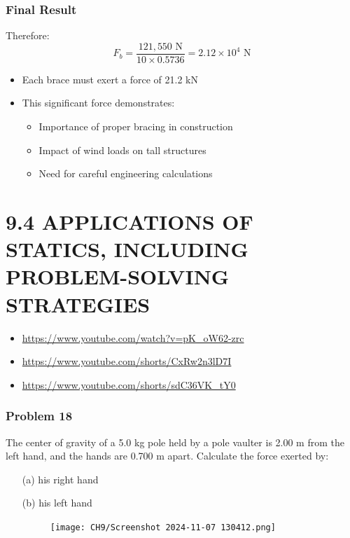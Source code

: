 \documentclass{beamer}
\begin{document}
\begin{frame}
\frametitle{Final Result}
Therefore:
\begin{equation*}
F_b = \frac{121,550\text{ N}}{10 \times 0.5736} = 2.12 \times 10^4\text{ N}
\end{equation*}

\begin{itemize}
    \item Each brace must exert a force of 21.2 kN
    \item This significant force demonstrates:
    \begin{itemize}
        \item Importance of proper bracing in construction
        \item Impact of wind loads on tall structures
        \item Need for careful engineering calculations
    \end{itemize}
\end{itemize}
\end{frame}



\section{9.4 APPLICATIONS OF STATICS, INCLUDING PROBLEM-SOLVING STRATEGIES}


\begin{itemize}
    \item \url{https://www.youtube.com/watch?v=pK_oW62-zrc}
    \item \url{https://www.youtube.com/shorts/CxRw2n3lD7I}
    \item \url{https://www.youtube.com/shorts/sdC36VK_tY0}
\end{itemize}

\begin{frame}
\frametitle{Problem 18}
The center of gravity of a 5.0 kg pole held by a pole vaulter is 2.00 m from the left hand, and the hands are 0.700 m apart. Calculate the force exerted by:
\begin{itemize}
    \item[(a)] his right hand
    \item[(b)] his left hand
\begin{figure}[H]
    \centering
    \texttt{[image: CH9/Screenshot 2024-11-07 130412.png]}
\end{figure}
\end{itemize}
\end{frame}
\end{document}
